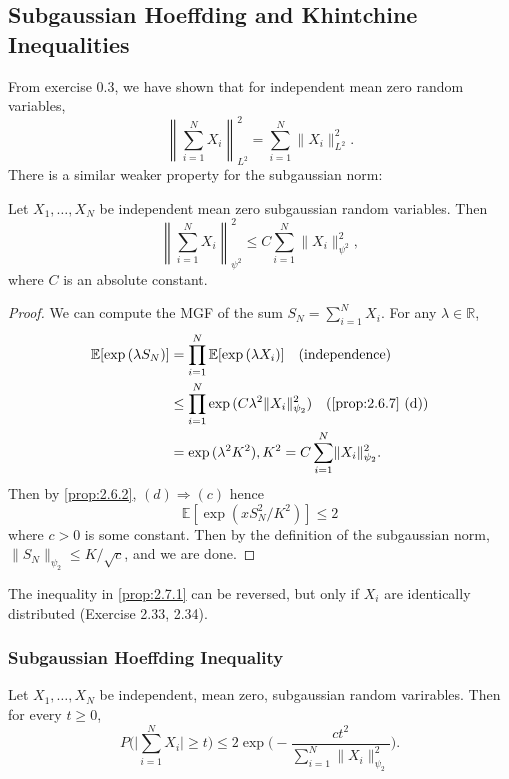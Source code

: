 \subsection{Subgaussian Hoeffding and Khintchine Inequalities}
From exercise 0.3, we have shown that for independent mean zero random variables, 
\[ \left\lVert \sum_{i = 1}^{N} X_i \right\lVert_{L^2}^2 = \sum_{i = 1}^{N} \lVert X_i \rVert_{L^2}^2. \]
There is a similar weaker property for the subgaussian norm: 

\begin{proposition}
\label{prop:2.7.1}
Let $X_1, \dots, X_N$ be independent mean zero subgaussian random variables. Then 
\[ \left\lVert \sum_{i = 1}^{N} X_i \right\lVert_{\psi^2}^2 \leq C\sum_{i = 1}^{N} 
\lVert X_i \rVert_{\psi^2}^2, \]
where $C$ is an absolute constant.
\end{proposition}

\begin{proof}
We can compute the MGF of the sum $S_N = \sum_{i = 1}^{N} X_i$. For any $\lambda \in \mathbb{R}$, 
\begin{align*}
	\mathbb{E}[\exp{(\lambda S_N)}] 
	&= \prod_{i = 1}^{N} \mathbb{E}[\exp{(\lambda X_i)}] \quad \text{(independence)} \\
	&\leq \prod_{i = 1}^{N} \exp{(C \lambda^2 \lVert X_i \rVert_{\psi_2}^2)} 
	\quad \text{(\cref{prop:2.6.7} (d))} \\
	&= \exp{(\lambda^2 K^2)}, K^2 = C \sum_{i = 1}^{N} \lVert X_i \rVert_{\psi_2}^2.
\end{align*}
Then by \cref{prop:2.6.2}, $(d) \Rightarrow (c)$ hence 
\[ \mathbb{E}[\exp{(x S_N^2 / K^2)}] \leq 2 \]
where $c > 0$ is some constant. Then by the definition of the subgaussian norm, $\lVert S_N \rVert_{\psi_2} 
\leq K / \sqrt{c}$, and we are done.
\end{proof}

\begin{remark}
\label{rmk:2.7.2}
The inequality in \cref{prop:2.7.1} can be reversed, but only if $X_i$ are identically distributed 
(Exercise 2.33, 2.34).
\end{remark}


\subsubsection{Subgaussian Hoeffding Inequality}
\begin{theorem}
\label{thm:2.7.3}
Let $X_1, \dots, X_N$ be independent, mean zero, subgaussian random varirables. Then for every $t \geq 0$, 
\[ P \biggl( \bigg| \sum_{i = 1}^{N} X_i \bigg| \geq t \biggr) 
\leq 2\exp{\biggl( -\frac{ct^2}{\sum_{i = 1}^{N} \lVert X_i \rVert_{\psi_2}^2} \biggr)}. \]
\end{theorem}

